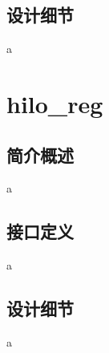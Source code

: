     \subsection{设计细节}
    a

\section{hilo\_reg}

    \subsection{简介概述}
    a

    \subsection{接口定义}
    a

    \subsection{设计细节}
    a
